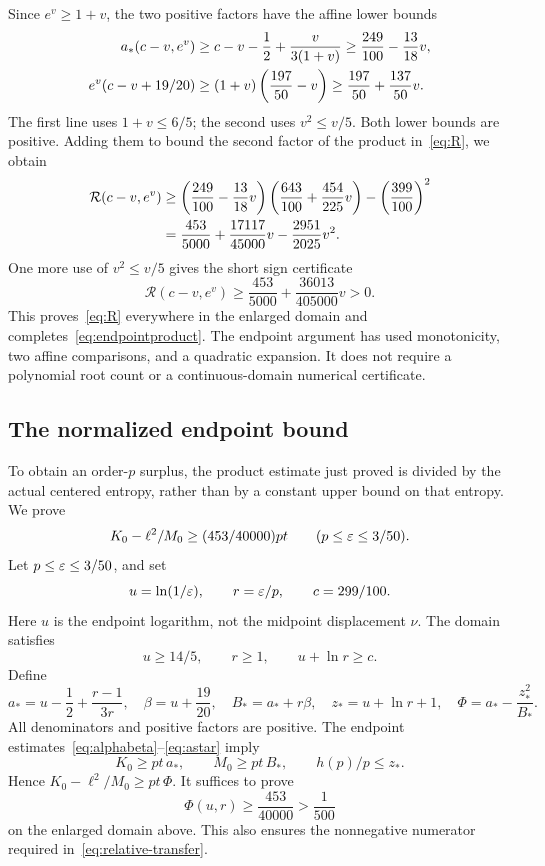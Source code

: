 Since $e^v\ge1+v$, the two positive factors have the affine lower bounds
\begin{align}\label{eq:affinefactors}
a_*(c-v,e^v)
&\ge c-v-\frac12+\frac{v}{3(1+v)}
\ge\frac{249}{100}-\frac{13}{18}v,\notag\\
e^v(c-v+19/20)
&\ge(1+v)\left(\frac{197}{50}-v\right)
\ge\frac{197}{50}+\frac{137}{50}v.
\end{align}
The first line uses $1+v\le6/5$; the second uses $v^2\le v/5$. Both lower bounds are positive. Adding them to bound the second factor of the product in~\eqref{eq:R}, we obtain
\begin{align}\label{eq:affineproduct}
\mathcal R(c-v,e^v)
&\ge\left(\frac{249}{100}-\frac{13}{18}v\right)
\left(\frac{643}{100}+\frac{454}{225}v\right)
-\left(\frac{399}{100}\right)^2\notag\\
&=\frac{453}{5000}+\frac{17117}{45000}v-\frac{2951}{2025}v^2.
\end{align}
One more use of $v^2\le v/5$ gives the short sign certificate
\begin{equation}\label{eq:shortsign}
\mathcal R(c-v,e^v)
\ge\frac{453}{5000}+\frac{36013}{405000}v>0.
\end{equation}
This proves~\eqref{eq:R} everywhere in the enlarged domain and completes~\eqref{eq:endpointproduct}. The endpoint argument has used monotonicity, two affine comparisons, and a quadratic expansion. It does not require a polynomial root count or a continuous-domain numerical certificate.

\subsection{The normalized endpoint bound}\label{app:normalized}
To obtain an order-$p$ surplus, the product estimate just proved is divided by the actual centered entropy, rather than by a constant upper bound on that entropy. We prove
\[
 K_0-\ell^2/M_0\ge(453/40000)pt
 \qquad(p\le\varepsilon\le3/50).
\]
 Let $p\le\varepsilon\le3/50$, and set
\[
u=\ln(1/\varepsilon),\qquad r=\varepsilon/p,\qquad c=299/100.
\]
Here $u$ is the endpoint logarithm, not the midpoint displacement $\nu$. The domain satisfies
\[
u\ge14/5,\qquad r\ge1,\qquad u+\ln r\ge c.
\]
Define
\begin{equation}\label{eq:relative-definitions}
a_*=u-\frac12+\frac{r-1}{3r},\quad
\beta=u+\frac{19}{20},\quad B_*=a_*+r\beta,\quad
z_*=u+\ln r+1,\quad \Phi=a_*-\frac{z_*^2}{B_*}.
\end{equation}
All denominators and positive factors are positive. The endpoint estimates~\eqref{eq:alphabeta}--\eqref{eq:astar} imply
\[
K_0\ge pt\,a_*,\qquad M_0\ge pt\,B_*,\qquad h(p)/p\le z_*.
\]
Hence $K_0-\ell^2/M_0\ge pt\,\Phi$. It suffices to prove
\begin{equation}\label{eq:relative-positive}
\Phi(u,r)\ge\frac{453}{40000}>\frac1{500}
\end{equation}
on the enlarged domain above. This also ensures the nonnegative numerator required in~\eqref{eq:relative-transfer}.

